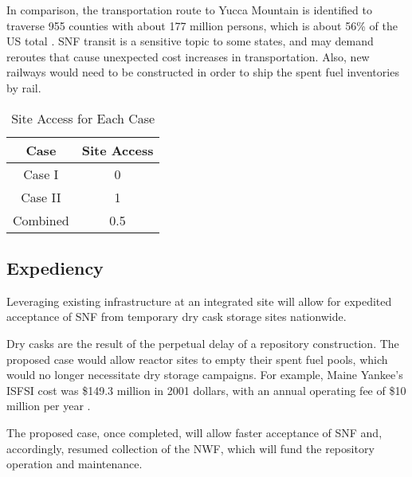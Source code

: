 In comparison, the 
transportation route to Yucca Mountain is identified to traverse 955 counties
with about 177 million persons, which is about 56\% of the US total
 \cite{halstead_yucca_2011}. \gls{SNF} transit is a sensitive topic to some states, and may
 demand reroutes that cause unexpected cost increases in transportation. Also,
 new railways would need to be constructed in order to ship the spent fuel inventories
 by rail. 


\begin{table}[h]
	\centering
        \caption {Site Access for Each Case}
		\begin{tabular}{|c|c|}
			\hline
			Case & Site Access \\
			\hline
			Case I & 0 \\
			Case II & 1 \\
			Combined & 0.5\\ 
			\hline
                \end{tabular}
\end{table}



\subsection{Expediency}



Leveraging existing infrastructure at an integrated site will allow for 
expedited acceptance of \gls{SNF} from temporary dry cask storage sites 
nationwide.

Dry casks are the result of the perpetual delay of a repository construction.
The proposed case would allow reactor sites to empty their spent fuel pools, which
would no longer necessitate dry storage campaigns. For example, Maine Yankee's 
\gls{ISFSI} cost was \$149.3 million in 2001 dollars, with an annual operating fee
of \$10 million per year \cite{lee_costing_2009}. 

The proposed case, once completed, will allow faster acceptance of \gls{SNF} and, 
accordingly, resumed collection of the \gls{NWF}, 
which will fund the repository operation and maintenance.

